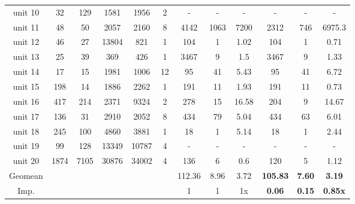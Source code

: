 \begin{table*}[!t]
\begin{tabular}{cccccc|ccc|ccc}
    unit 10 & \multicolumn{1}{c}{32} & \multicolumn{1}{c}{129} & \multicolumn{1}{c}{1581} & \multicolumn{1}{c}{1956} & 2 & -     & -     & -     & -     & -     & - \\
    unit 11 & \multicolumn{1}{c}{48} & \multicolumn{1}{c}{50} & \multicolumn{1}{c}{2057} & \multicolumn{1}{c}{2160} & 8 & 4142  & 1063  & 7200  & 2312  & 746   & 6975.3 \\
    unit 12 & \multicolumn{1}{c}{46} & \multicolumn{1}{c}{27} & \multicolumn{1}{c}{13804} & \multicolumn{1}{c}{821} & 1 & 104   & 1     & 1.02  & 104   & 1     & 0.71 \\
    unit 13 & \multicolumn{1}{c}{25} & \multicolumn{1}{c}{39} & \multicolumn{1}{c}{369} & \multicolumn{1}{c}{426} & 1 & 3467  & 9     & 1.5   & 3467  & 9     & 1.33 \\
    unit 14 & \multicolumn{1}{c}{17} & \multicolumn{1}{c}{15} & \multicolumn{1}{c}{1981} & \multicolumn{1}{c}{1006} & 12 & 95    & 41    & 5.43  & 95    & 41    & 6.72 \\
    unit 15 & \multicolumn{1}{c}{198} & \multicolumn{1}{c}{14} & \multicolumn{1}{c}{1886} & \multicolumn{1}{c}{2262} & 1 & 191   & 11    & 1.93  & 191   & 11    & 0.73 \\
    unit 16 & \multicolumn{1}{c}{417} & \multicolumn{1}{c}{214} & \multicolumn{1}{c}{2371} & \multicolumn{1}{c}{9324} & 2 & 278   & 15    & 16.58 & 204   & 9     & 14.67 \\
    unit 17 & \multicolumn{1}{c}{136} & \multicolumn{1}{c}{31} & \multicolumn{1}{c}{2910} & \multicolumn{1}{c}{2052} & 8 & 434   & 79    & 5.04  & 434   & 63    & 6.01 \\
    unit 18 & \multicolumn{1}{c}{245} & \multicolumn{1}{c}{100} & \multicolumn{1}{c}{4860} & \multicolumn{1}{c}{3881} & 1 & 18    & 1     & 5.14  & 18    & 1     & 2.44 \\
    unit 19 & \multicolumn{1}{c}{99} & \multicolumn{1}{c}{128} & \multicolumn{1}{c}{13349} & \multicolumn{1}{c}{10787} & 4 & -     & -     & -     & -     & -     & - \\
    unit 20 & \multicolumn{1}{c}{1874} & \multicolumn{1}{c}{7105} & \multicolumn{1}{c}{30876} & \multicolumn{1}{c}{34002} & 4 & 136   & 6     & 0.6   & 120   & 5     & 1.12 \\
    \midrule
    Geomean &       &       &       &       &       & 112.36  & 8.96  & 3.72  & \textbf{105.83}  & \textbf{7.60}  & \textbf{3.19}  \\
    Imp. &       &       &       &       &       & 1     & 1     & 1x    & \textbf{0.06}  & \textbf{0.15}  & \textbf{0.85x} \\
    \bottomrule
    \end{tabular}%
  \label{compare on ICCAD 2017 contest}%
  \vspace{-15pt}
\end{table*}%


